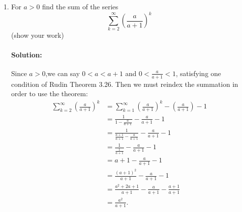 \documentclass{article}
\begin{document}
\begin{enumerate}
\begin{enumerate}
\begin{proof}
            Now consider:
            \begin{align*}
            \limsup\limits_{k \to \infty}\sqrt[k]{\left| \frac{2}{k^p} \right| ^k}  
            &=\limsup\limits_{k \to \infty}\left| \frac{2}{k^{p}} \right| \\
            &=\limsup\limits_{k \to \infty}\frac{2}{k^{p}}\\
            &=\lim\limits_{k \to \infty}\frac{2}{k^{p}}&\text{By Rudin Theorem 3.18}\\
            &=2\lim\limits_{k \to \infty}\frac{1}{k^{p}}\\
            &=2(0)&\text{By Rudin Theorem 3.20}\\
            &= 0 \\
            &<1
            .\end{align*}
            So by Rudin Theorem 3.33 this series is convergent, and so our original series must be.

        \end{proof}

        \newpage
        \item For $a>0$ find the sum of the series
        $$\sum_{k=2}^\infty\left(\frac a{a+1}\right)^k$$ (show your work)

        \paragraph{Solution: }Since $a>0$,we can say $0<a<a+1$ and $0<\frac{a}{a+1}<1$, satisfying one 
        condition of Rudin Theorem 3.26. 
        Then we must reindex the summation in order to use the theorem:
        \begin{align*}
            \sum_{k=2}^\infty\left(\frac a{a+1}\right)^k&= 
            \sum_{k=1}^\infty\left(\frac a{a+1}\right)^k-\left( \frac{a}{a+1} \right) -1\\
            &= \frac{1}{1-\frac{a}{a+1}}-\frac{a}{a+1} -1\\
            &= \frac{1}{\frac{a+1}{a+1}-\frac{a}{a+1}}-\frac{a}{a+1} -1\\
            &= \frac{1}{\frac{1}{a+1}}-\frac{a}{a+1} -1\\
            &= a+1-\frac{a}{a+1} -1\\
            &= \frac{(a+1)^2}{a+1}-\frac{a}{a+1} -1\\
            &= \frac{a^2+2a+1}{a+1}-\frac{a}{a+1} -\frac{a+1}{a+1}\\
            &= \frac{a^2}{a+1}
        .\end{align*}


\end{enumerate}
\end{enumerate}
\end{document}
